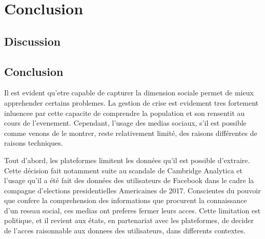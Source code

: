 \chapter*{Conclusion}

\section{Discussion}


\section{Conclusion}
Il est evident qu'etre capable de capturer la dimension sociale permet de mieux apprehender certains problemes.
La gestion de crise est evidement tres fortement inluencee par cette capacite de comprendre la population et son rensentit au cours de l'evenement.
Cependant, l'usage des medias sociaux, s'il est possible comme venons de le montrer, reste relativement limité, des raisons différentes de raisons techniques.

Tout d'abord, les plateformes limitent les données qu'il est possible d'extraire.
Cette décision fait notamment suite au scandale de Cambridge Analytica et l'usage qu'il a été fait des données des utilisateurs de Facebook dans le cadre la compagne d'elections presidentielles Americaines de 2017.
Conscientes du pouvoir que confere la comprehension des informations que procurent la connaissance d'un reseau social, ces medias ont preferes fermer leurs acces.
Cette limitation est politique, et il revient aux états, en partenariat avec les plateformes, de decider de l'acces raisonnable aux donnees des utilisateurs, dans differents contextes.


